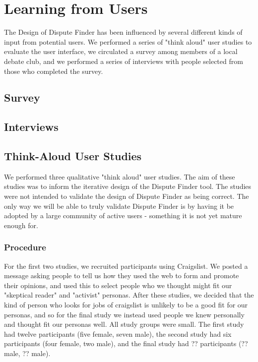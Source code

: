 \documentclass{www2010-submission}
\begin{document}
\section{Learning from Users}

The Design of Dispute Finder has been influenced by several different kinds of input from potential users. We performed a series of "think aloud" user studies to evaluate the user interface, we circulated a survey among members of a local debate club, and we performed a series of interviews with people selected from those who completed the survey.

\subsection{Survey}

\subsection{Interviews}

\subsection{Think-Aloud User Studies}

We performed three qualitative "think aloud" user studies. The aim of these studies was to inform the iterative design of the Dispute Finder tool. The studies were not intended to validate the design of Dispute Finder as being correct. The only way we will be able to truly validate Dispute Finder is by having it be adopted by a large community of active users - something it is not yet mature enough for.

\subsubsection{Procedure}

For the first two studies, we recruited participants using Craigslist. We posted a message asking people to tell us how they used the web to form and promote their opinions, and used this to select people who we thought might fit our "skeptical reader" and "activist" personas. After these studies, we decided that the kind of person who looks for jobs of craigslist is unlikely to be a good fit for our personas, and so for the final study we instead used people we knew personally and thought fit our personas well. All study groups were small. The first study had twelve participants (five female, seven male), the second study had six participants (four female, two male), and the final study had ?? participants (?? male, ?? male). 
\end{document}
